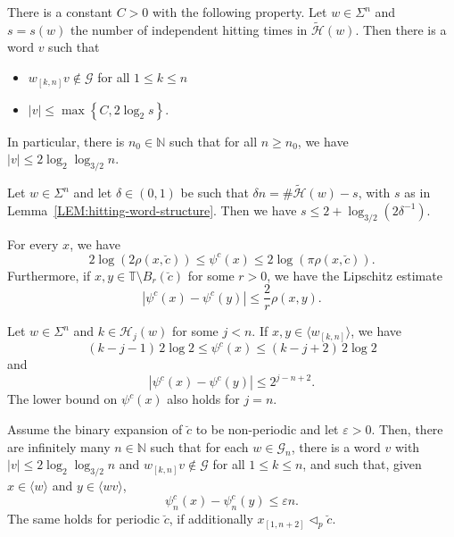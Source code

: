 \documentclass[10pt,a4paper]{amsart}
\newcommand{\N}{{\mathbb N}}
\newcommand{\mc}{\mathcal}
\begin{document}
\begin{lemma}
\label{LEM:closing-extension-II}
There is a constant $C>0$ with the following property. Let $w \in \Sigma^n$ and $s = s(w)$ the number of independent hitting times in $\widetilde{\mc H}(w)$. Then there is a word $v$ such that
\begin{itemize}
\item $w_{[k,n]}v \notin \mc G$ for all $1\leqslant k \leqslant n$
\item $|v| \leqslant \max \left\{C, 2 \log_2 s \right\}$.
\end{itemize}
In particular, there is $n_0 \in \N$ such that for all $n \geqslant n_0$, we have $|v| \leqslant 2 \log_2 \log_{3/2} n$.
\end{lemma}

\begin{lemma}
\label{LEM:s-hitting-relation}
Let $w \in \Sigma^n$ and let $\delta \in (0,1)$ be such that $\delta n = \# \widetilde{\mc H}(w) - s$, with $s$ as in Lemma~\ref{LEM:hitting-word-structure}. Then we have $s \leqslant 2 + \log_{3/2} (2\delta^{-1})$.
\end{lemma}

\begin{lemma}
\label{LEM:psi-distance-bound}
For every $x$, we have
\[
2 \log (2 \rho(x,\breve{c})) \leqslant \psi^c(x)
\leqslant 2 \log (\pi \rho(x, \breve{c})).
\]
Furthermore, if $x,y \in \mathbb{T} \setminus B_r(\breve{c})$ for some $r>0$, we have the Lipschitz estimate
\[
|\psi^c(x) - \psi^c(y)| \leqslant \frac{2}{r} \rho(x,y).
\]
\end{lemma}

\begin{lemma}
\label{LEM:psi-on-hitting}
Let $w \in \Sigma^n$ and $k \in \mc H_j(w)$ for some $j < n$. If $x,y \in \langle w_{[k,n]} \rangle$, we have
\[
(k-j-1)\, 2 \log 2
\leqslant \psi^c(x) \leqslant 
(k-j +2)\, 2 \log 2
\]
and
\[
|\psi^c(x) - \psi^c(y)|
\leqslant  2^{j-n + 2}.
\]
The lower bound on $\psi^c(x)$ also holds for $j=n$.
\end{lemma}

\begin{lemma}
\label{LEM:block-for-variation-bound}
Assume the binary expansion of $\breve{c}$ to be non-periodic and let $\varepsilon > 0$. Then, there are infinitely many $n\in \N$ such that for each $w \in \mc G_n$, there is a word $v$ with $|v| \leqslant 2 \log_2 \log_{3/2} n$ and $w_{[k,n]}v \notin \mc G$ for all $1\leq k \leq n$, and such that, given $x \in \langle w \rangle$ and $y \in \langle wv \rangle$,
\[
\psi^c_n(x) - \psi^c_n(y) \leqslant \varepsilon n.
\]
The same holds for periodic $\breve{c}$, if additionally $x_{[1,n+2]} \triangleleft_p \breve{c}$.
\end{lemma}
\end{document}
